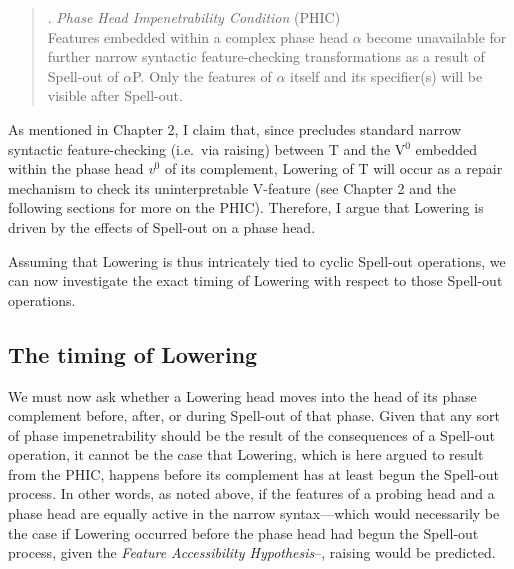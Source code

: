 \singlespacing
\begin{quote}
\begin{minipage}{5in}
\ex. {\it Phase Head Impenetrability Condition} (PHIC)\\
Features embedded within a complex phase head $\alpha$ become unavailable for further narrow syntactic feature-checking transformations as a result of Spell-out of $\alpha$P. Only the features of $\alpha$ itself and its specifier(s) will be visible after Spell-out.

\end{minipage}
\end{quote}
\onehalfspacing
As mentioned in Chapter 2, I claim that, since \Last precludes standard narrow syntactic feature-checking (i.e.\ via raising) between T\raisebox{-4pt}{\footnotesize{[-V]}} and the V$^{0}$ embedded within the phase head {\it v}$^{0}$ of its complement, Lowering of T\raisebox{-4pt}{\footnotesize{[-V]}} will occur as a repair mechanism to check its uninterpretable V-feature (see Chapter 2 and the following sections for more on the PHIC). Therefore, I argue that Lowering is driven by the effects of Spell-out on a phase head.

Assuming that Lowering is thus intricately tied to cyclic Spell-out operations, we can now investigate the exact timing of Lowering with respect to those Spell-out operations.

\subsection{The timing of Lowering}\label{low_timing_sec}
We must now ask whether a Lowering head moves into the head of its phase complement before, after, or during Spell-out of that phase. Given that any sort of phase impenetrability should be the result of the consequences of a Spell-out operation, it cannot be the case that Lowering, which is here argued to result from the PHIC, happens before its complement has at least begun the Spell-out process. In other words, as noted above, if the features of a probing head and a phase head are equally active in the narrow syntax---which would necessarily be the case if Lowering occurred before the phase head had begun the Spell-out process, given the {\it Feature Accessibility Hypothesis}--, raising would be predicted.


